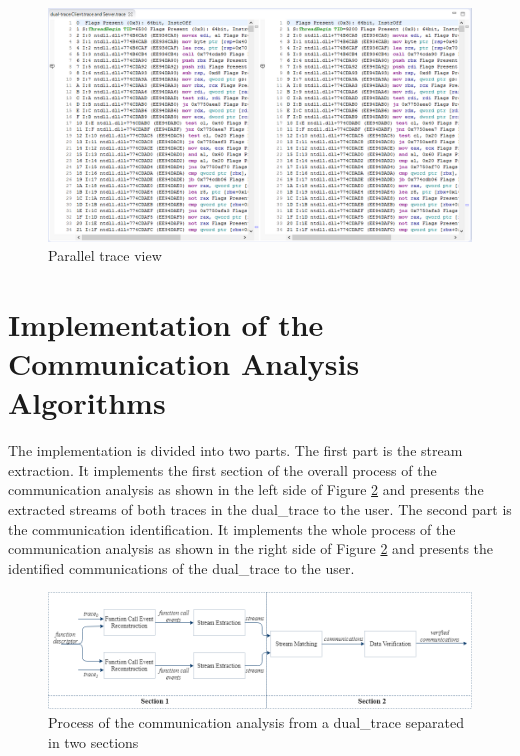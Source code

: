 \documentclass[12pt,oneside]{book}
\begin{document}
\begin{figure}[H]
\centerline{\includegraphics[scale=0.6]{Figures/paralleleditor}}
 \caption{Parallel trace view}
\label{parallelview}
\end{figure}

\section{Implementation of the Communication Analysis Algorithms}
The implementation is divided into two parts. The first part is the stream extraction. It implements the first section of the overall process of the communication analysis as shown in the left side of Figure \ref{overviewintwo} and presents the extracted streams of both traces in the dual\_trace to the user. The second part is the communication identification. It implements the whole process of the communication analysis as shown in the right side of Figure \ref{overviewintwo} and presents the identified communications of the dual\_trace to the user.

\begin{figure}[H]
\centerline{\includegraphics[scale=0.47]{Figures/overviewintwo}}
\caption{Process of the communication analysis from a dual\_trace separated in two sections}
\label{overviewintwo}
\end{figure}
\end{document}
